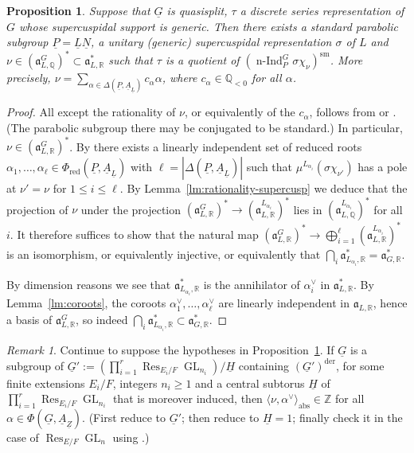 \documentclass[a4paper]{amsart}
\numberwithin{equation}{section}
\newtheorem{prop}[thm]{Proposition}
\theoremstyle{remark}
\newtheorem{remark}[thm]{Remark}
\theoremstyle{definition}
\DeclareMathOperator{\nInd}{n-Ind}
\DeclareMathOperator{\Res}{Res}
\newcommand{\Z}{\mathbb{Z}}
\newcommand{\Q}{\mathbb{Q}}
\newcommand{\R}{\mathbb{R}}
\DeclareMathOperator{\GL}{GL}
\newcommand{\sm}{\mathrm{sm}}
\newcommand{\alggrp}[1]{\underline{#1}}
\newcommand{\der}{\mathrm{der}}
\newcommand{\abs}{\mathrm{abs}}
\newcommand{\ang}[1]{\langle #1\rangle}
\begin{document}
\begin{prop}\label{prop:rationality-supercusp}
  Suppose that $\alggrp{G}$ is quasisplit, $\tau$ a discrete series representation of $G$ whose supercuspidal support is generic.
  Then there exists a standard parabolic subgroup $\alggrp{P} = \alggrp{L}\alggrp{N}$, a unitary (generic) supercuspidal representation $\sigma$ of $L$
  and $\nu \in (\mathfrak{a}_{L,\Q}^G)^* \subset \mathfrak{a}_{L,\R}^*$ such that $\tau$ is a quotient of $(\nInd_P^G \sigma \chi_\nu)^\sm$.
  More precisely, $\nu = \sum_{\alpha\in\Delta(\alggrp{P},\alggrp{A}_{\alggrp{L}})} c_\alpha \alpha$, where $c_\alpha \in \Q_{<0}$ for all $\alpha$.
\end{prop}

\begin{proof}
  All except the rationality of $\nu$, or equivalently of the $c_\alpha$, follows from \cite[p.\ 582]{MR577138} or \cite[Proposition III.1.1]{MR1989693}.
  (The parabolic subgroup there may be conjugated to be standard.)
  In particular, $\nu \in (\mathfrak{a}_{L,\R}^G)^{*}$.
  By \cite[p.\ 582]{MR577138} there exists a linearly independent set of reduced roots $\alpha_1,\dots,\alpha_\ell \in \Phi_{\mathrm{red}}(\alggrp{P},\alggrp{A}_{\alggrp{L}})$ with $\ell = |\Delta(\alggrp{P},\alggrp{A}_{\alggrp{L}})|$
  such that $\mu^{L_{\alpha_i}}(\sigma \chi_{\nu'})$ has a pole at $\nu' = \nu$ for $1 \le i \le \ell$.
  By Lemma~\ref{lm:rationality-supercusp} we deduce that the projection of $\nu$ under the projection $(\mathfrak{a}^G_{L,\R})^* \to (\mathfrak{a}^{L_{\alpha_i}}_{L,\R})^*$
  lies in $(\mathfrak{a}^{L_{\alpha_i}}_{L,\Q})^*$ for all $i$.
  It therefore suffices to show that the natural map $(\mathfrak{a}^G_{L,\R})^* \to \bigoplus_{i=1}^\ell (\mathfrak{a}^{L_{\alpha_i}}_{L,\R})^*$ is an isomorphism,
  or equivalently injective, or equivalently that $\bigcap_i \mathfrak{a}_{L_{\alpha_i},\R}^* = \mathfrak{a}_{G,\R}^*$.

  By dimension reasons we see that $\mathfrak{a}_{L_{\alpha_i},\R}^*$ is the annihilator of $\alpha_i^{\vee}$ in $\mathfrak{a}_{L,\R}^*$.
  By Lemma~\ref{lm:coroots}, the coroots $\alpha_1^{\vee},\dots,\alpha_\ell^{\vee}$ are linearly independent in $\mathfrak{a}_{L,\R}$, hence a basis of $\mathfrak{a}_{L,\R}^G$, so indeed $\bigcap_i \mathfrak{a}_{L_{\alpha_i},\R}^* \subset \mathfrak{a}_{G,\R}^*$.
\end{proof}

\begin{remark}\label{rk:generic-gln}
  Continue to suppose the hypotheses in Proposition~\ref{prop:rationality-supercusp}.
  If $\alggrp G$ is a subgroup of $\alggrp G' := (\prod_{i=1}^r \Res_{E_i/F}\GL_{n_i})/\alggrp{H}$ containing $(\alggrp G')^{\der}$,
  for some finite extensions $E_i/F$, integers $n_i \ge 1$ and a central subtorus $\alggrp{H}$ of $\prod_{i=1}^r \Res_{E_i/F}\GL_{n_i}$ that is moreover induced,
  then $\ang{\nu,\alpha^\vee}_{\abs} \in \Z$ for all $\alpha \in \Phi(\alggrp G, \alggrp A_{\alggrp Z})$.
  (First reduce to $\alggrp G'$; then reduce to $\alggrp H = 1$; finally check it in the case of $\Res_{E/F}\GL_{n}$ using \cite[Theorem 9.3]{MR584084}.)
\end{remark}
\end{document}
